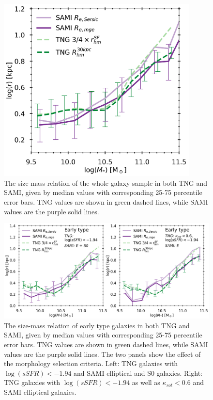 \begin{figure}
    \centering
    \includegraphics[width=0.9\textwidth]{images/SM_R.png}
    \caption{The size-mass relation of the whole galaxy sample in both TNG and SAMI, given by median values with corresponding 25-75 percentile error bars. TNG values are shown in green dashed lines, while SAMI values are the purple solid lines.}
    \label{SM_R}
\end{figure}

\begin{figure}
    \centering
    \includegraphics[width=\textwidth]{images/SM_R_earlies.png}
    \caption{The size-mass relation of early type galaxies in both TNG and SAMI, given by median values with corresponding 25-75 percentile error bars. TNG values are shown in green dashed lines, while SAMI values are the purple solid lines. The two panels show the effect of the morphology selection criteria. Left: TNG galaxies with $\log(sSFR) < -1.94$ and SAMI elliptical and S0 galaxies. Right: TNG galaxies with $\log(sSFR) < -1.94$ as well as $\kappa_{rot} < 0.6$ and SAMI elliptical galaxies.}
    \label{SM_R_earlies}
\end{figure}

